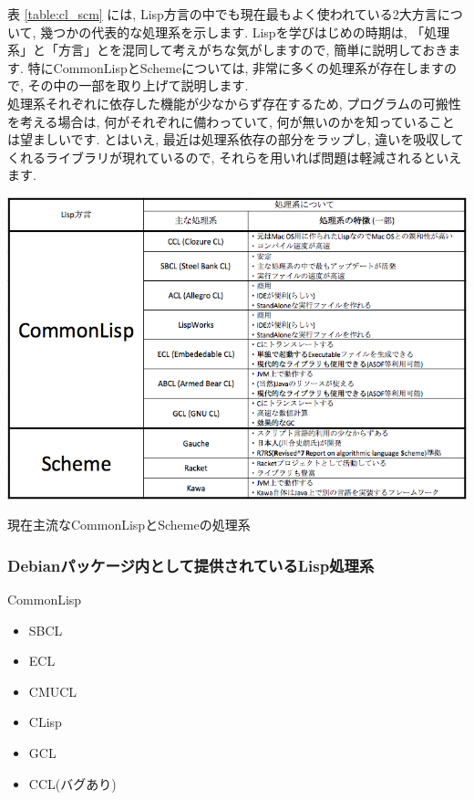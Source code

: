 \documentclass[mingoth,a4paper]{jsarticle}
\begin{document}
表 \ref{table:cl_scm} には, Lisp方言の中でも現在最もよく使われている2大方言について, 幾つかの代表的な処理系を示します. Lispを学びはじめの時期は, 「処理系」と「方言」とを混同して考えがちな気がしますので, 簡単に説明しておきます. 
特にCommonLispとSchemeについては, 非常に多くの処理系が存在しますので, その中の一部を取り上げて説明します.\vspace{1em}\\ 
処理系それぞれに依存した機能が少なからず存在するため, プログラムの可搬性を考える場合は, 何がそれぞれに備わっていて, 何が無いのかを知っていることは望ましいです. とはいえ, 最近は処理系依存の部分をラップし, 違いを吸収してくれるライブラリが現れているので, それらを用いれば問題は軽減されるといえます. 

\begin{table}[htbp!]
\centering
\includegraphics[scale=0.5]{image201709-kansai/cl-scm.png}
\caption{現在主流なCommonLispとSchemeの処理系}\label{table:cl_scm}
\end{table}

\pagebreak

\subsubsection{Debianパッケージ内として提供されているLisp処理系}

CommonLisp
\begin{itemize}
\item SBCL
\item ECL
\item CMUCL
\item CLisp
\item GCL
\item CCL(バグあり)
\end{itemize}
\end{document}
